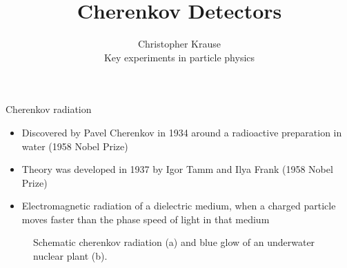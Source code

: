 \documentclass[aspectratio=1610, 10pt]{beamer}
\title{\Large{Cherenkov Detectors}}
\author[C.~Krause]{\normalsize{Christopher Krause \\
Key experiments in particle physics}}
\begin{document}
\maketitle


\begin{frame}{Cherenkov radiation}
  \begin{itemize}
    \item Discovered by Pavel Cherenkov in 1934 around a radioactive preparation in water (1958 Nobel Prize)
    \item Theory was developed in 1937 by Igor Tamm and Ilya Frank (1958 Nobel Prize)
    \item Electromagnetic radiation of a dielectric medium, when a charged particle moves
    faster than the phase speed of light in that medium
  \end{itemize}
  \begin{figure}
      \hspace{1cm}
  \caption{Schematic cherenkov radiation (a) and blue glow of an underwater nuclear plant (b).}
  \end{figure}
\end{frame}
\end{document}
